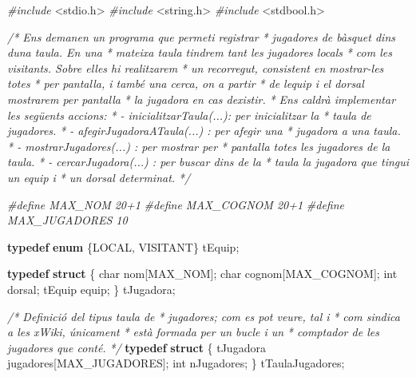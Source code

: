 \documentclass[]{book}
\newenvironment{Shaded}{\begin{snugshade}}{\end{snugshade}}
\newcommand{\CommentTok}[1]{\textcolor[rgb]{0.56,0.35,0.01}{\textit{#1}}}
\newcommand{\DataTypeTok}[1]{\textcolor[rgb]{0.13,0.29,0.53}{#1}}
\newcommand{\ImportTok}[1]{#1}
\newcommand{\KeywordTok}[1]{\textcolor[rgb]{0.13,0.29,0.53}{\textbf{#1}}}
\newcommand{\NormalTok}[1]{#1}
\newcommand{\PreprocessorTok}[1]{\textcolor[rgb]{0.56,0.35,0.01}{\textit{#1}}}
\begin{document}
\begin{Shaded}
\begin{Highlighting}[]
\PreprocessorTok{\#include }\ImportTok{\textless{}stdio.h\textgreater{}}
\PreprocessorTok{\#include }\ImportTok{\textless{}string.h\textgreater{}}
\PreprocessorTok{\#include }\ImportTok{\textless{}stdbool.h\textgreater{}}

\CommentTok{/* Ens demanen un programa que permeti registrar}
\CommentTok{ * jugadores de bàsquet dins d\textquotesingle{}una taula. En una}
\CommentTok{ * mateixa taula tindrem tant les jugadores locals}
\CommentTok{ * com les visitants. Sobre elles hi realitzarem}
\CommentTok{ * un recorregut, consistent en mostrar{-}les totes}
\CommentTok{ * per pantalla, i també una cerca, on a partir }
\CommentTok{ * de l\textquotesingle{}equip i el dorsal mostrarem per pantalla}
\CommentTok{ * la jugadora en cas d\textquotesingle{}existir.}
\CommentTok{ * Ens caldrà implementar les següents accions:}
\CommentTok{ * {-} inicialitzarTaula(...): per inicialitzar la}
\CommentTok{ *   taula de jugadores.}
\CommentTok{ * {-} afegirJugadoraATaula(...) : per afegir una}
\CommentTok{ *   jugadora a una taula.}
\CommentTok{ * {-} mostrarJugadores(...) : per mostrar per }
\CommentTok{ *   pantalla totes les jugadores de la taula.}
\CommentTok{ * {-} cercarJugadora(...) : per buscar dins de la}
\CommentTok{ *   taula la jugadora que tingui un equip i }
\CommentTok{ *   un dorsal determinat.}
\CommentTok{ */}
 
\PreprocessorTok{\#define MAX\_NOM 20+1}
\PreprocessorTok{\#define MAX\_COGNOM 20+1}
\PreprocessorTok{\#define MAX\_JUGADORES 10}

\KeywordTok{typedef} \KeywordTok{enum}\NormalTok{ \{LOCAL, VISITANT\} tEquip;}

\KeywordTok{typedef} \KeywordTok{struct}\NormalTok{ \{}
    \DataTypeTok{char}\NormalTok{ nom[MAX\_NOM];}
    \DataTypeTok{char}\NormalTok{ cognom[MAX\_COGNOM];}
    \DataTypeTok{int}\NormalTok{ dorsal;}
\NormalTok{    tEquip equip;}
\NormalTok{\} tJugadora;}

\CommentTok{/* Definició del tipus taula de}
\CommentTok{ * jugadores; com es pot veure, tal i }
\CommentTok{ * com s\textquotesingle{}indica a les xWiki, únicament}
\CommentTok{ * està formada per un bucle i un }
\CommentTok{ * comptador de les jugadores que conté.}
\CommentTok{ */}
\KeywordTok{typedef} \KeywordTok{struct}\NormalTok{ \{}
\NormalTok{    tJugadora jugadores[MAX\_JUGADORES];}
    \DataTypeTok{int}\NormalTok{ nJugadores;}
\NormalTok{\} tTaulaJugadores;}


\end{Highlighting}
\end{Shaded}
\end{document}

